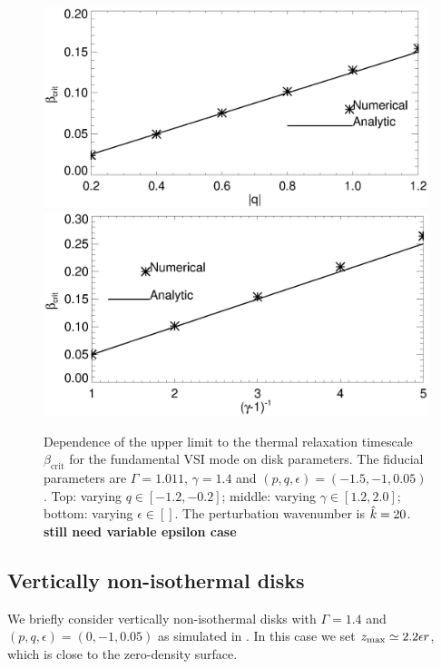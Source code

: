 \begin{figure}
  \includegraphics[width=\linewidth,clip=true,trim=0cm 0.cm 0cm
  0cm]{figures/bcrit_compare_q.ps} 
  \includegraphics[width=\linewidth,clip=true,trim=0cm 0.0cm 0cm
  0.8cm]{figures/bcrit_compare_g.ps} 
  \caption{Dependence of the upper limit to the thermal relaxation timescale
    $\beta_\mathrm{crit}$ for the fundamental VSI mode on disk
    parameters. The fiducial parameters are $\Gamma=1.011$,
    $\gamma=1.4$ and $(p,q,\epsilon)=(-1.5,-1,0.05)$. Top: varying
    $q\in[-1.2,-0.2]$; middle: varying $\gamma\in[1.2,2.0]$; bottom:
    varying $\epsilon\in[]$. The perturbation wavenumber is
    $\hat{k}=20$. {\bf still need variable epsilon case}
    \label{bcrit_compare}}  
\end{figure}


\subsection{Vertically non-isothermal disks}
We briefly consider vertically non-isothermal disks with 
$\Gamma=1.4$ and $(p,q,\epsilon)=(0,-1,0.05)$ as simulated in
\cite{nelson13}. In this case we set $z_\mathrm{max}\simeq2.2\epsilon r$, which
is close to the zero-density surface.     

